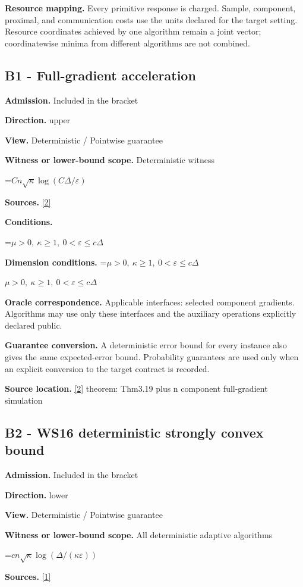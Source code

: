 \documentclass[10pt,a4paper]{article}
\newcommand{\AtlasMath}[1]{\par\begingroup\centering\setbox0=\hbox{$\displaystyle #1$}\ifdim\wd0>1.4\linewidth\typeout{ATLAS WIDE FORMULA: \the\wd0}\fi\ifdim\wd0>\linewidth\resizebox{\linewidth}{!}{\box0}\else\box0\fi\par\endgroup}
\newcommand{\AtlasInlineMath}[1]{\begingroup\setbox0=\hbox{$#1$}\ifdim\wd0>.4\linewidth\endgroup\AtlasMath{#1}\else\endgroup$#1$\fi}
\begin{document}
\textbf{Resource mapping.} Every primitive response is charged. Sample, component, proximal, and communication costs use the units declared for the target setting. Resource coordinates achieved by one algorithm remain a joint vector; coordinatewise minima from different algorithms are not combined.

\subsection{B1 - Full-gradient acceleration}
\textbf{Admission.} Included in the bracket

\textbf{Direction.} upper

\textbf{View.} Deterministic / Pointwise guarantee

\textbf{Witness or lower-bound scope.} Deterministic witness

\AtlasMath{Cn\sqrt\kappa\log(C\Delta/\varepsilon)}
\textbf{Sources.} \href{https://arxiv.org/pdf/1405.4980}{[2]}

\textbf{Conditions.} 
\AtlasMath{\mu>0,\ \kappa\ge1,\ 0<\varepsilon\le c\Delta}


\textbf{Dimension conditions.} \AtlasInlineMath{\mu>0,\ \kappa\ge1,\ 0<\varepsilon\le c\Delta}

\textbf{Oracle correspondence.} Applicable interfaces: selected component gradients. Algorithms may use only these interfaces and the auxiliary operations explicitly declared public.

\textbf{Guarantee conversion.} A deterministic error bound for every instance also gives the same expected-error bound. Probability guarantees are used only when an explicit conversion to the target contract is recorded.

\textbf{Source location.} \href{https://arxiv.org/pdf/1405.4980}{[2]} theorem: Thm3.19 plus n component full-gradient simulation

\subsection{B2 - WS16 deterministic strongly convex bound}
\textbf{Admission.} Included in the bracket

\textbf{Direction.} lower

\textbf{View.} Deterministic / Pointwise guarantee

\textbf{Witness or lower-bound scope.} All deterministic adaptive algorithms

\AtlasMath{cn\sqrt\kappa\log(\Delta/(\kappa\varepsilon))}
\textbf{Sources.} \href{https://arxiv.org/pdf/1605.08003v3}{[1]}
\end{document}
